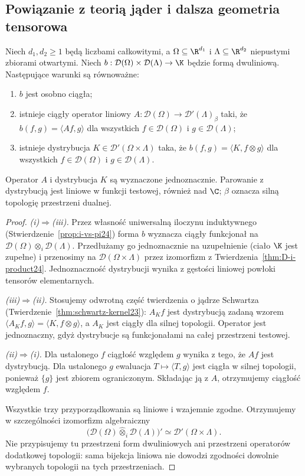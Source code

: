 \subsection{Powiązanie z teorią jąder i dalsza geometria tensorowa}

\begin{wniosek}
\label{cor:kernel-i24}
Niech $d_1,d_2\ge1$ będą liczbami całkowitymi,
a $\Omega\subseteq\R^{d_1}$ i $\Lambda\subseteq\R^{d_2}$
niepustymi zbiorami otwartymi. Niech
$b:\mathcal D(\Omega)\times\mathcal D(\Lambda)\to\K$
będzie formą dwuliniową. Następujące warunki są równoważne:
\begin{enumerate}[label=\textup{(\roman*)},leftmargin=*]
\item $b$ jest osobno ciągła;
\item istnieje ciągły operator liniowy
$A:\mathcal D(\Omega)\to\mathcal D'(\Lambda)_\beta$
taki, że $b(f,g)=\langle Af,g\rangle$ dla wszystkich
$f\in\mathcal D(\Omega)$ i $g\in\mathcal D(\Lambda)$;
\item istnieje dystrybucja
$K\in\mathcal D'(\Omega\times\Lambda)$ taka, że
$b(f,g)=\langle K,f\otimes g\rangle$ dla wszystkich
$f\in\mathcal D(\Omega)$ i $g\in\mathcal D(\Lambda)$.
\end{enumerate}
Operator $A$ i dystrybucja $K$ są wyznaczone jednoznacznie.
Parowanie z dystrybucją jest liniowe w funkcji testowej,
również nad $\C$; $\beta$ oznacza silną topologię
przestrzeni dualnej.
\end{wniosek}
\begin{proof}
\emph{(i)$\Rightarrow$(iii).}
Przez własność uniwersalną iloczynu induktywnego
(Stwierdzenie~\ref{prop:i-vs-pi24}) forma $b$
wyznacza ciągły funkcjonał na
$\mathcal D(\Omega)\otimes_i\mathcal D(\Lambda)$.
Przedłużamy go jednoznacznie na uzupełnienie (ciało
$\K$ jest zupełne) i przenosimy na
$\mathcal D(\Omega\times\Lambda)$ przez izomorfizm
z Twierdzenia~\ref{thm:D-i-product24}.
Jednoznaczność dystrybucji wynika z gęstości
liniowej powłoki tensorów elementarnych.

\emph{(iii)$\Rightarrow$(ii).}
Stosujemy odwrotną część twierdzenia o jądrze
Schwartza (Twierdzenie~\ref{thm:schwartz-kernel23}):
$A_Kf$ jest dystrybucją zadaną wzorem
$\langle A_Kf,g\rangle=\langle K,f\otimes g\rangle$,
a $A_K$ jest ciągły dla silnej topologii.
Operator jest jednoznaczny, gdyż dystrybucje
są funkcjonałami na całej przestrzeni testowej.

\emph{(ii)$\Rightarrow$(i).}
Dla ustalonego $f$ ciągłość względem $g$ wynika
z tego, że $Af$ jest dystrybucją. Dla ustalonego
$g$ ewaluacja $T\mapsto\langle T,g\rangle$ jest
ciągła w silnej topologii, ponieważ $\{g\}$
jest zbiorem ograniczonym. Składając ją z $A$,
otrzymujemy ciągłość względem $f$.

Wszystkie trzy przyporządkowania są liniowe
i wzajemnie zgodne. Otrzymujemy w szczególności
izomorfizm algebraiczny
\[
 \bigl(\mathcal D(\Omega)\widehat\otimes_i
 \mathcal D(\Lambda)\bigr)'
 \simeq\mathcal D'(\Omega\times\Lambda).
\]
Nie przypisujemy tu przestrzeni form dwuliniowych
ani przestrzeni operatorów dodatkowej topologii:
sama bijekcja liniowa nie dowodzi zgodności
dowolnie wybranych topologii na tych przestrzeniach.
\end{proof}

